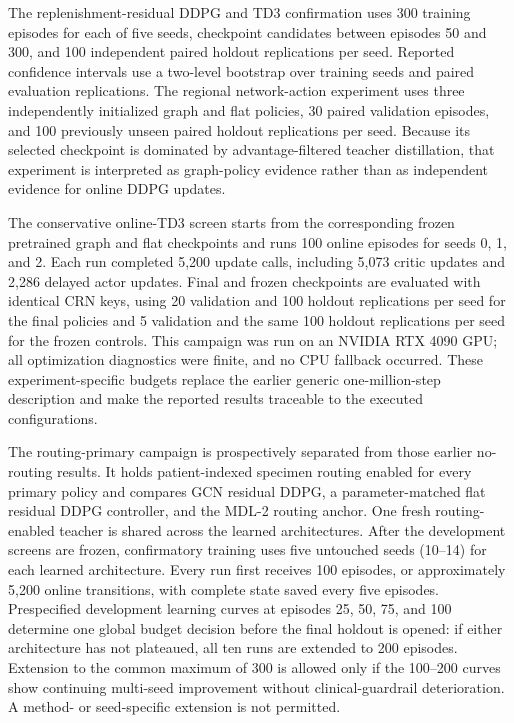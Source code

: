 \documentclass[preprint,review,12pt]{elsarticle}
\begin{document}
The replenishment-residual DDPG and TD3 confirmation uses 300 training episodes
for each of five seeds, checkpoint candidates between episodes 50 and 300, and
100 independent paired holdout replications per seed. Reported confidence
intervals use a two-level bootstrap over training seeds and paired evaluation
replications. The regional network-action experiment uses three independently
initialized graph and flat policies, 30 paired validation episodes, and 100
previously unseen paired holdout replications per seed. Because its selected
checkpoint is dominated by advantage-filtered teacher distillation, that
experiment is interpreted as graph-policy evidence rather than as independent
evidence for online DDPG updates.

The conservative online-TD3 screen starts from the corresponding frozen
pretrained graph and flat checkpoints and runs 100 online episodes for seeds
0, 1, and 2. Each run completed 5,200 update calls, including 5,073 critic
updates and 2,286 delayed actor updates. Final and frozen checkpoints are
evaluated with identical CRN keys, using 20 validation and 100 holdout
replications per seed for the final policies and 5 validation and the same 100
holdout replications per seed for the frozen controls. This campaign was run
on an NVIDIA RTX 4090 GPU; all optimization diagnostics were finite, and no
CPU fallback occurred. These experiment-specific budgets replace the earlier
generic one-million-step description and make the reported results traceable
to the executed configurations.

The routing-primary campaign is prospectively separated from those earlier
no-routing results. It holds patient-indexed specimen routing enabled for every
primary policy and compares GCN residual DDPG, a parameter-matched flat
residual DDPG controller, and the MDL-2 routing anchor. One fresh
routing-enabled teacher is shared across the learned architectures. After the
development screens are frozen, confirmatory training uses five untouched
seeds (10--14) for each learned architecture. Every run first
receives 100 episodes, or approximately 5,200 online transitions, with complete
state saved every five episodes. Prespecified development learning curves at
episodes 25, 50, 75, and 100 determine one global budget decision before the
final holdout is opened: if either architecture has not plateaued, all ten runs
are extended to 200 episodes. Extension to the common maximum of 300 is allowed
only if the 100--200 curves show continuing multi-seed improvement without
clinical-guardrail deterioration. A method- or seed-specific extension is not
permitted.
\end{document}
